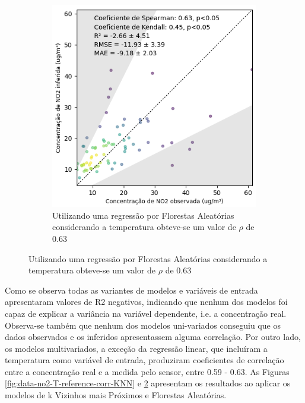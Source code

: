 \begin{figure}[h!]
\begin{subfigure}{0.49\textwidth}
    \end{subfigure}
    \hfill
    \begin{subfigure}{0.49\textwidth}
        \includegraphics[width=\textwidth]{chapters/4-CALIBRAÇÃO MÚLTIPLOS SENSORES/Figuras/no2-T-RF-Regression.png}
        \caption{Utilizando uma regressão por Florestas Aleatórias considerando a temperatura obteve-se um valor de $\rho$ de 0.63}
        \label{fig:data-no2-T-reference-corr-RF}
    \end{subfigure}
\end{figure}

Como se observa todas as variantes de modelos e variáveis de entrada apresentaram valores de R2 negativos, indicando que nenhum dos modelos foi capaz de explicar a variância na variável dependente, i.e. a concentração real. Observa-se também que nenhum dos modelos uni-variados conseguiu que os dados observados e os inferidos apresentassem alguma correlação. Por outro lado, os modelos multivariados, a exceção da regressão linear, que incluíram a temperatura como variável de entrada, produziram coeficientes de correlação entre a concentração real e a medida pelo sensor, entre 0.59 - 0.63. As Figuras \ref{fig:data-no2-T-reference-corr-KNN} e \ref{fig:data-no2-T-reference-corr-RF} apresentam os resultados ao aplicar os modelos de k Vizinhos mais Próximos e Florestas Aleatórias.

